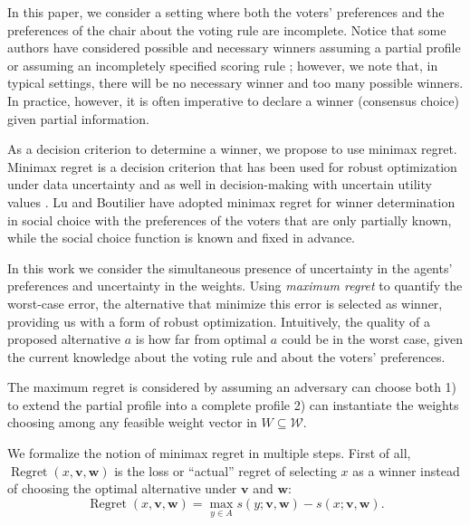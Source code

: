\documentclass[12pt]{article}
\newcommand{\profile}{\textbf{v}}%
\newcommand{\w}{\textbf{w}}%
\DeclareMathOperator{\Regret}{Regret}
\begin{document}
In this paper, we consider a setting where both the voters' preferences and the preferences of the chair about the voting rule are incomplete.
Notice that some authors have considered possible and necessary winners assuming a partial profile  \cite{Xia2008} or assuming an incompletely specified scoring rule \cite{Viappiani2018};
however, we note that, in typical settings, there will be no necessary winner and too many possible winners.
In practice, however, it is often imperative to declare a winner (consensus choice) given partial information.

As a decision criterion to determine a winner, we propose to use minimax regret. 
Minimax regret \cite{Savage1954} is a decision criterion that has been used for robust optimization under data uncertainty \cite{Kouvelis1997} and as well in decision-making with uncertain utility values  \cite{Salo2001,Boutilier2006}.
Lu and Boutilier \cite{Lu2011} have adopted minimax regret for winner determination in social choice with
the preferences of the voters that are only partially known, while the social choice function is known and fixed in advance.

In this work we consider the simultaneous presence of uncertainty in the agents' preferences and uncertainty in the weights.
Using {\em maximum regret} to quantify the worst-case error, the alternative that minimize this error is selected as winner, providing us with a form of robust optimization.
Intuitively, the quality of a proposed alternative $a$ is how far from optimal $a$  could be in the worst case, given the current knowledge about the voting rule and about the voters' preferences.

The maximum regret is considered by assuming an adversary can choose both 1) to extend the partial profile into a complete profile 2) can instantiate the weights choosing among any feasible weight vector in $W \subseteq \mathcal{W}$.

We formalize the notion of minimax regret in multiple steps.
First of all, $\Regret(x, \profile, \w)$ is the loss or ``actual'' regret  of selecting $x$ as a winner instead of choosing the optimal alternative under $\profile$ and $\w$:
\[\Regret(x, \profile, \w) = \max_{y \in A} s(y; \profile,\w) - s(x; \profile, \w).\]
\end{document}

